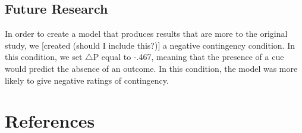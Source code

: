 \documentclass[
  english,
  man,floatsintext]{apa6}
\begin{document}
\hypertarget{future-research}{%
\subsection{Future Research}\label{future-research}}

In order to create a model that produces results that are more to the original study, we {[}created (should I include this?){]} a negative contingency condition. In this condition, we set \(\triangle\)P equal to -.467, meaning that the presence of a cue would predict the absence of an outcome. In this condition, the model was more likely to give negative ratings of contingency.

\newpage

\hypertarget{references}{%
\section{References}\label{references}}

\begingroup
\setlength{\parindent}{-0.5in}
\setlength{\leftskip}{0.5in}
\end{document}
